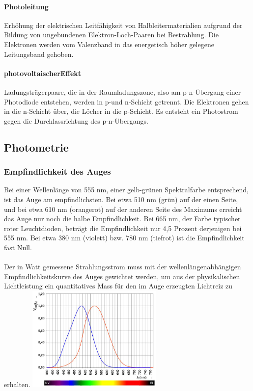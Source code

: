 \paragraph{Photoleitung}
Erhöhung der elektrischen Leitfähigkeit von Halbleitermaterialien aufgrund der Bildung von ungebundenen Elektron-Loch-Paaren bei Bestrahlung. Die Elektronen werden vom Valenzband in das energetisch höher gelegene Leitungsband gehoben.

\paragraph{photovoltaischerEffekt}
Ladungsträgerpaare, die in der Raumladungszone, also am p-n-Übergang einer Photodiode entstehen, werden in p-und n-Schicht getrennt. Die Elektronen gehen in die n-Schicht über, die Löcher in die p-Schicht. Es entsteht ein Photostrom gegen die Durchlassrichtung des p-n-Übergangs.

\subsection{Photometrie}
\subsubsection{Empfindlichkeit des Auges}
\begin{multicols}{2}
Bei einer Wellenlänge von 555 nm, einer gelb-grünen Spektralfarbe entsprechend, ist das Auge am empfindlichsten. Bei etwa 510 nm (grün) auf der einen Seite, und bei etwa 610 nm (orangerot) auf der anderen Seite des Maximums erreicht das Auge nur noch die halbe Empfindlichkeit. Bei 665 nm, der Farbe typischer roter Leuchtdioden, beträgt die Empfindlichkeit nur 4,5 Prozent derjenigen bei 555 nm. Bei etwa 380 nm (violett) bzw. 780 nm (tiefrot) ist die Empfindlichkeit fast Null. \\ \\
Der in Watt gemessene Strahlungsstrom muss mit der wellenlängenabhängigen Empfindlichkeitskurve des Auges gewichtet werden, um aus der physikalischen Lichtleistung ein quantitatives Mass für den im Auge erzeugten Lichtreiz zu erhalten.
\includegraphics[width=0.5\textwidth]{images/empfindlichkeit_auge} 
\end{multicols}

